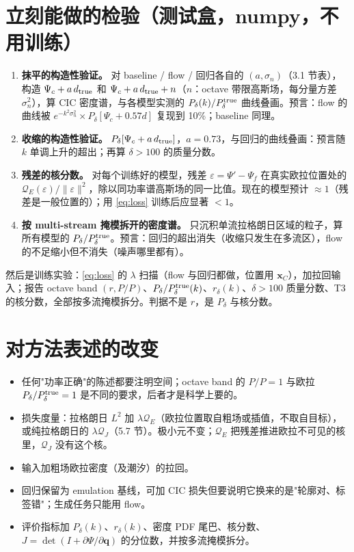 \documentclass[11pt,UTF8,fontset=none]{ctexart}
\newcommand{\q}{\mathbf{q}}
\newcommand{\x}{\mathbf{x}}
\newcommand{\Pd}{P_\delta}
\newcommand{\Psic}{\Psi_c}
\newcommand{\Psif}{\Psi_f}
\newcommand{\QE}{\mathcal Q_E}
\begin{document}
\section{立刻能做的检验（测试盒，numpy，不用训练）}

\begin{enumerate}[leftmargin=2em]
\item[T1] \textbf{抹平的构造性验证。} 对 baseline / flow / 回归各自的 $(a,\sigma_n)$（3.1 节表），构造 $\Psic+a\,d_{\rm true}$ 和 $\Psic+a\,d_{\rm true}+n$（$n$：octave 带限高斯场，每分量方差 $\sigma_n^2$），算 CIC 密度谱，与各模型实测的 $\Pd(k)/\Pd^{\rm true}$ 曲线叠画。预言：flow 的曲线被 $e^{-k^2\sigma_n^2}\times\Pd[\Psic+0.57d]$ 复现到 10\%；baseline 同理。
\item[T2] \textbf{收缩的构造性验证。} $\Pd[\Psic+a\,d_{\rm true}]$，$a=0.73$，与回归的曲线叠画：预言随 $k$ 单调上升的超出；再算 $\delta>100$ 的质量分数。
\item[T3] \textbf{残差的核分数。} 对每个训练好的模型，残差 $\varepsilon=\Psi'-\Psif$ 在真实欧拉位置处的 $\QE(\varepsilon)/\|\varepsilon\|^2$，除以同功率谱高斯场的同一比值。现在的模型预计 $\approx1$（残差是一般位置的）；用 \eqref{eq:loss} 训练后应显著 $<1$。
\item[T4] \textbf{按 multi-stream 掩模拆开的密度谱。} 只沉积单流拉格朗日区域的粒子，算所有模型的 $\Pd/\Pd^{\rm true}$。预言：回归的超出消失（收缩只发生在多流区），flow 的不足缩小但不消失（噪声哪里都有）。
\end{enumerate}
然后是训练实验：\eqref{eq:loss} 的 $\lambda$ 扫描（flow 与回归都做，位置用 $\x_C$），加拉回输入；报告 octave band $(r,P/P)$、$\Pd/\Pd^{\rm true}(k)$、$r_\delta(k)$、$\delta>100$ 质量分数、T3 的核分数，全部按多流掩模拆分。判据不是 $r$，是 $\Pd$ 与核分数。

\section{对方法表述的改变}

\begin{itemize}[leftmargin=2em,nosep]
\item 任何"功率正确"的陈述都要注明空间；octave band 的 $P/P=1$ 与欧拉 $\Pd/\Pd^{\rm true}=1$ 是不同的要求，后者才是科学上要的。
\item 损失度量：拉格朗日 $L^2$ 加 $\lambda\QE$（欧拉位置取自粗场或插值，不取自目标），或纯拉格朗日的 $\lambda\mathcal Q_J$（5.7 节）。极小元不变；$\QE$ 把残差推进欧拉不可见的核里，$\mathcal Q_J$ 没有这个核。
\item 输入加粗场欧拉密度（及潮汐）的拉回。
\item 回归保留为 emulation 基线，可加 CIC 损失但要说明它换来的是"轮廓对、标签错"；生成任务只能用 flow。
\item 评价指标加 $\Pd(k)$、$r_\delta(k)$、密度 PDF 尾巴、核分数、$J=\det(I+\partial\Psi/\partial\q)$ 的分位数，并按多流掩模拆分。
\end{itemize}
\end{document}
